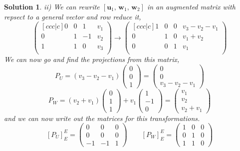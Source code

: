 \documentclass{article}
\renewcommand{\vec}[1]{\boldsymbol{\mathbf{#1}}}
\newcommand{\thbth}[9]{\begin{pmatrix} #1 & #2 & #3 \\ #4 & #5 & #6 \\ #7 & #8 & #9\end{pmatrix}}
\newtheorem{solution}{Solution}
\begin{document}
\begin{solution}
  \noindent
  ii) We can rewrite $[\vec u_1,\, \vec w_1,\, \vec w_2]$ in an augmented matrix with repsect to a general vector and row reduce it,
  $$ \begin{pmatrix}[ccc|c]
   0 & 0 & 1 & v_1 \\  0 & 1 & -1 & v_2\\ 1 & 1 & 0 & v_3 \\
 \end{pmatrix} \to \begin{pmatrix}[ccc|c]
  1 & 0 & 0 & v_3 - v_2 - v_1 \\  0 & 1 & 0 & v_1 + v_2 \\ 0 & 0 & 1 & v_1 \\
  \end{pmatrix} $$
  We can now go and find the projections from this matrix,
  $$ P_U = (v_3 - v_2 - v_1)\begin{pmatrix}0 \\ 0 \\ 1\end{pmatrix} = \begin{pmatrix} 0 \\ 0 \\ v_3 - v_2 - v_1\end{pmatrix} $$
  $$ P_W = (v_2 + v_1)\begin{pmatrix}0 \\ 1 \\ 1\end{pmatrix} + v_1 \begin{pmatrix}1 \\ -1 \\ 0\end{pmatrix} = \begin{pmatrix} v_1 \\ v_2 \\ v_2 + v_1\end{pmatrix} $$
  and we can now write out the matrices for this transformations.
  $$ [P_U]_E^E = \thbth 0 0 0 0 0 0 {-1} {-1} 1  \qquad [P_W]_E^E = \thbth 1 0 0 0 1 0 1 1 0$$
\end{solution}
\end{document}

